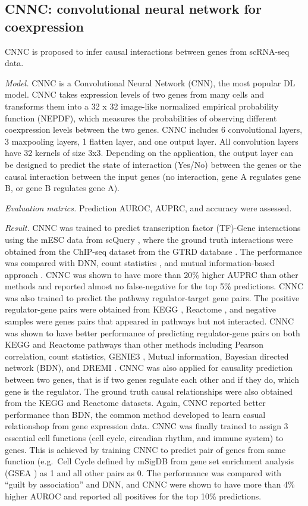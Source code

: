 \documentclass[
]{book}
\begin{document}
\hypertarget{ch-5-7-1}{%
\subsection{CNNC: convolutional neural network for coexpression}\label{ch-5-7-1}}

CNNC \citep{RN174} is proposed to infer causal interactions between genes from scRNA-seq data.

\emph{Model.} CNNC is a Convolutional Neural Network (CNN), the most popular DL model. CNNC takes expression levels of two genes from many cells and transforms them into a 32 x 32 image-like normalized empirical probability function (NEPDF), which measures the probabilities of observing different coexpression levels between the two genes. CNNC includes 6 convolutional layers, 3 maxpooling layers, 1 flatten layer, and one output layer. All convolution layers have 32 kernels of size 3x3. Depending on the application, the output layer can be designed to predict the state of interaction (Yes/No) between the genes or the causal interaction between the input genes (no interaction, gene A regulates gene B, or gene B regulates gene A).

\emph{Evaluation matrics.} Prediction AUROC, AUPRC, and accuracy were assessed.

\emph{Result.} CNNC was trained to predict transcription factor (TF)-Gene interactions using the mESC data from scQuery \citep{RN195}, where the ground truth interactions were obtained from the ChIP-seq dataset from the GTRD database \citep{RN196}. The performance was compared with DNN, count statistics \citep{RN197}, and mutual information-based approach \citep{RN178}. CNNC was shown to have more than 20\% higher AUPRC than other methods and reported almost no false-negative for the top 5\% predictions. CNNC was also trained to predict the pathway regulator-target gene pairs. The positive regulator-gene pairs were obtained from KEGG \citep{RN198}, Reactome \citep{RN176}, and negative samples were genes pairs that appeared in pathways but not interacted. CNNC was shown to have better performance of predicting regulator-gene pairs on both KEGG and Reactome pathways than other methods including Pearson correlation, count statistics, GENIE3 \citep{RN199}, Mutual information, Bayesian directed network (BDN), and DREMI \citep{RN178}. CNNC was also applied for causality prediction between two genes, that is if two genes regulate each other and if they do, which gene is the regulator. The ground truth causal relationships were also obtained from the KEGG and Reactome datasets. Again, CNNC reported better performance than BDN, the common method developed to learn casual relationshop from gene expression data. CNNC was finally trained to assign 3 essential cell functions (cell cycle, circadian rhythm, and immune system) to genes. This is achieved by training CNNC to predict pair of genes from same function (e.g.~Cell Cycle defined by mSigDB from gene set enrichment analysis (GSEA \citep{RN200}) as 1 and all other pairs as 0. The performance was compared with ``guilt by association'' and DNN, and CNNC were shown to have more than 4\% higher AUROC and reported all positives for the top 10\% predictions.
\end{document}
